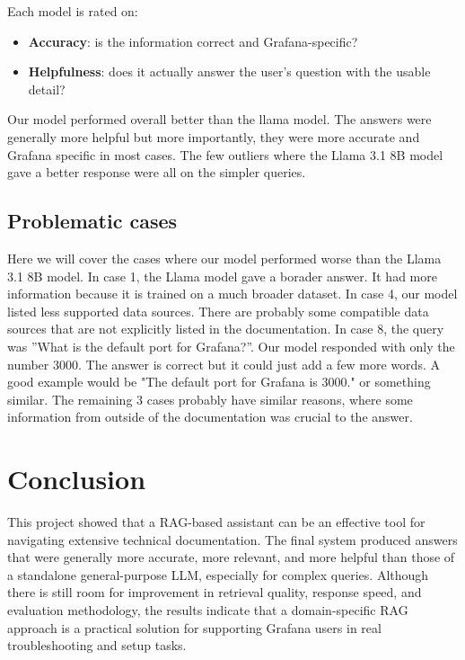 \documentclass[fleqn,moreauthors,10pt]{ds_report}
\begin{document}
Each model is rated on:
\begin{itemize}
    \item \textbf{Accuracy}: is the information correct and Grafana-specific?
    \item \textbf{Helpfulness}: does it actually answer the user's question with the usable detail?
\end{itemize}

Our model performed overall better than the llama model. The answers were generally more helpful but more importantly, they were more accurate and Grafana specific in most cases. The few outliers where the Llama 3.1 8B model gave a better response were all on the simpler queries.

\subsection*{Problematic cases}

Here we will cover the cases where our model performed worse than the Llama 3.1 8B model. In case 1, the Llama model gave a borader answer. It had more information because it is trained on a much broader dataset. In case 4, our model listed less supported data sources. There are probably some compatible data sources that are not explicitly listed in the documentation. In case 8, the query was ”What is the default port for Grafana?”. Our model responded with only the number 3000. The answer is correct but it could just add a few more words. A good example would be "The default port for Grafana is 3000." or something similar. The remaining 3 cases probably have similar reasons, where some information from outside of the documentation was crucial to the answer.

\section*{Conclusion}

This project showed that a RAG-based assistant can be an effective tool for navigating extensive technical documentation. The final system produced answers that were generally more accurate, more relevant, and more helpful than those of a standalone general-purpose LLM, especially for complex queries. Although there is still room for improvement in retrieval quality, response speed, and evaluation methodology, the results indicate that a domain-specific RAG approach is a practical solution for supporting Grafana users in real troubleshooting and setup tasks.
\end{document}
